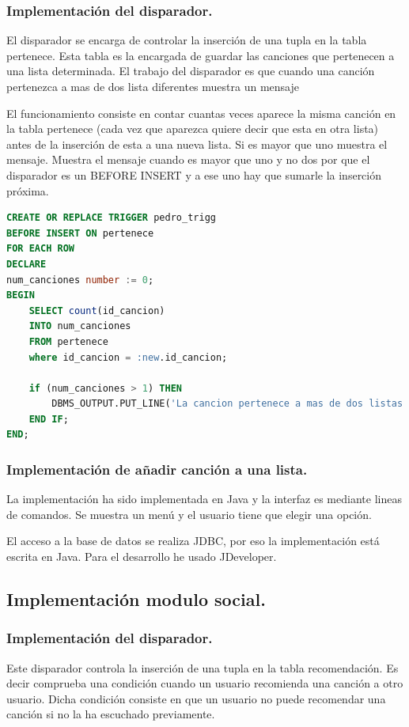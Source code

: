 \documentclass[12pt,a4paper]{article}
\begin{document}
\subsubsection{Implementación del disparador.}
	El disparador se encarga de controlar la inserción de una tupla en la tabla pertenece. Esta tabla es la encargada de guardar las canciones que pertenecen a una lista determinada. El trabajo del disparador es que cuando una canción pertenezca a mas de dos lista diferentes muestra un mensaje 
	
	El funcionamiento consiste en contar cuantas veces aparece la misma canción en la tabla pertenece (cada vez que aparezca quiere decir que esta en otra lista) antes de la inserción de esta a una nueva lista. Si es mayor que uno muestra el mensaje. Muestra el mensaje cuando es mayor que uno y no dos por que el disparador es un BEFORE INSERT y a ese uno hay que sumarle la inserción próxima.

\begin{lstlisting}[language=SQL]
CREATE OR REPLACE TRIGGER pedro_trigg
BEFORE INSERT ON pertenece
FOR EACH ROW
DECLARE
num_canciones number := 0;
BEGIN
    SELECT count(id_cancion) 
    INTO num_canciones 
    FROM pertenece  
    where id_cancion = :new.id_cancion;
    
	if (num_canciones > 1) THEN
		DBMS_OUTPUT.PUT_LINE('La cancion pertenece a mas de dos listas');
	END IF;    
END;
\end{lstlisting}

\subsubsection{Implementación de añadir canción a una lista.}
	La implementación ha sido implementada en Java y la interfaz es mediante lineas de comandos. Se muestra un menú y el usuario tiene que elegir una opción. 
	
	El acceso a la base de datos se realiza JDBC, por eso la implementación está escrita en Java. Para el desarrollo he usado JDeveloper.




\newpage
\subsection{Implementación modulo social.}
\subsubsection{Implementación del disparador.}
	Este disparador controla la inserción de una tupla en la tabla recomendación. Es decir comprueba una condición cuando un usuario recomienda una canción a otro usuario. Dicha condición consiste en que un usuario no puede recomendar una canción si no la ha escuchado previamente.
	
\end{document}
